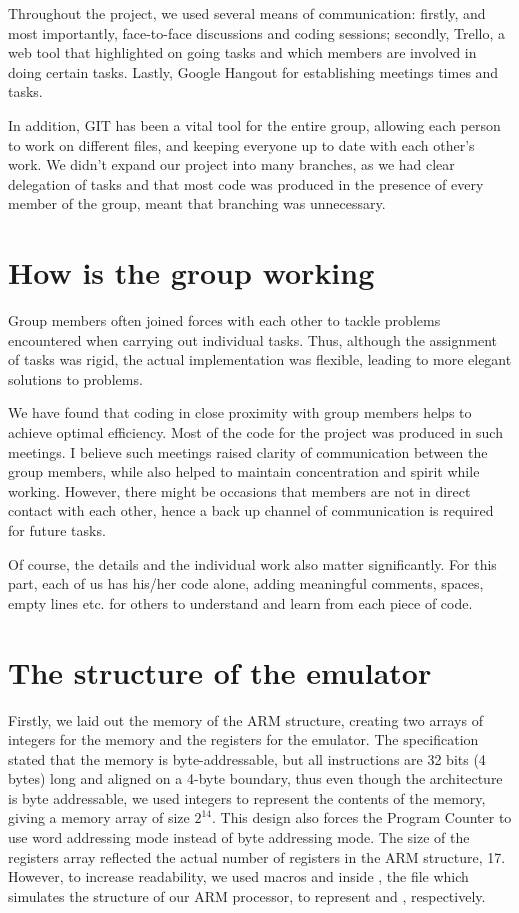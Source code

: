 \documentclass[10pt,a4paper]{article}
\begin{document}
Throughout the project, we used several means of communication: firstly, and most importantly, face-to-face discussions and coding sessions; secondly, Trello, a web tool that highlighted on going tasks and which members are involved in doing certain tasks. Lastly, Google Hangout for establishing meetings times and tasks.

In addition, GIT has been a vital tool for the entire group, allowing each person to work on different files, and keeping everyone up to date with each other's work. We didn't expand our project into many branches, as we had clear delegation of tasks and that most code was produced in the presence of every member of the group, meant that branching was unnecessary. 

\section{How is the group working}

Group members often joined forces with each other to tackle problems encountered when carrying out individual tasks. Thus, although the assignment of tasks was rigid, the actual implementation was flexible, leading to more elegant solutions to problems.

We have found that coding in close proximity with group members helps to achieve optimal efficiency. Most of the code for the project was produced in such meetings. I believe such meetings raised clarity of communication between the group members, while also helped to maintain concentration and spirit while working. However, there might be occasions that members are not in direct contact with each other, hence a back up channel of communication is required for future tasks.

Of course, the details and the individual work also matter significantly. For this part, each of us has  his/her code alone, adding meaningful comments, spaces, empty lines etc. for others to understand and learn from each piece of code. 

\section{The structure of the emulator}

Firstly, we laid out the memory of the ARM structure, creating two arrays of integers for the memory and the registers for the emulator. The specification stated that the memory is byte-addressable, but all instructions are 32 bits (4 bytes) long and aligned on a 4-byte boundary, thus even though the architecture is byte addressable, we used integers to represent the contents of the memory, giving a memory array of size $2^{14}$. This design also forces the Program Counter to use word addressing mode instead of byte addressing mode. The size of the registers array reflected the actual number of registers in the ARM structure, 17. However, to increase readability, we used macros  and  inside , the file which simulates the structure of our ARM processor, to represent  and , respectively.
\end{document}
